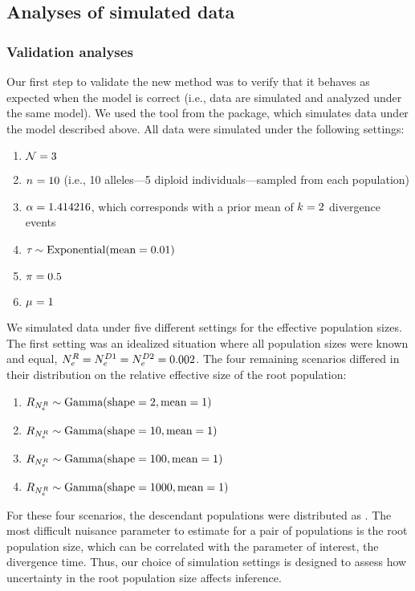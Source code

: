 \subsection{Analyses of simulated data}

\subsubsection{Validation analyses}
Our first step to validate the new method was to verify that it behaves as
expected when the model is correct (i.e., data are simulated and analyzed under
the same model).
We used the \simcoevolity tool from the \ecoevolity package, which simulates
data under the model described above.
All data were simulated under the following settings:
\begin{enumerate}
    \item $\ncomparisons = 3$
    \item $\allelecount = 10$ (i.e., 10 alleles---5 diploid
        individuals---sampled from each population)
    \item $\concentration = 1.414216$, which corresponds with a prior mean of
        $\nevents = 2$ divergence events
    \item $\divtime \sim \dexponential{0.01}$
    \item $\gfreq = 0.5$
    \item $\murate = 1$
\end{enumerate}
We simulated data under five different settings for the effective population
sizes.
The first setting was an idealized situation where all population sizes were
known and equal,
$\epopsize[\rootpopindex] = 
\epopsize[\descendantpopindex{1}] =
\epopsize[\descendantpopindex{2}] = 0.002$.
The four remaining scenarios differed in their distribution on the relative
effective size of the root population:
\begin{enumerate}
    \item $\rootrelativepopsize \sim \dgamma{2}{1}$
    \item $\rootrelativepopsize \sim \dgamma{10}{1}$
    \item $\rootrelativepopsize \sim \dgamma{100}{1}$
    \item $\rootrelativepopsize \sim \dgamma{1000}{1}$
\end{enumerate}
For these four scenarios, the descendant populations were distributed as
.
The most difficult nuisance parameter to estimate for a pair of populations is
the root population size, which can be correlated with the parameter of
interest, the divergence time.
Thus, our choice of simulation settings is designed to assess how uncertainty
in the root population size affects inference.

